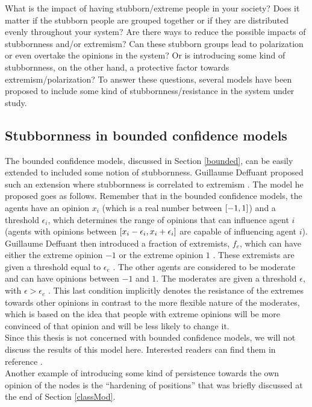 \documentclass[11 pt , letterpaper , twoside , openright]{book}
\begin{document}
\newline
What is the impact of having stubborn/extreme people in your society? Does it matter if the stubborn people are grouped together or if they are distributed evenly throughout your system? Are there ways to reduce the possible impacts of stubbornness and/or extremism? Can these stubborn groups lead to polarization or even overtake the opinions in the system? Or is introducing some kind of stubbornness, on the other hand, a protective factor towards extremism/polarization? To answer these questions, several models have been proposed to include some kind of stubbornness/resistance in the system under study.

\subsection{Stubbornness in bounded confidence models}

The bounded confidence models, discussed in Section \ref{bounded}, can be easily extended to included some notion of stubbornness. Guillaume Deffuant proposed such an extension where stubbornness is correlated to extremism \cite{Deffuant2006}. The model he proposed goes as follows. Remember that in the bounded confidence models, the agents have an opinion $x_i$ (which is a real number between $\interval{-1}{1}$) and a threshold $\epsilon_i$, which determines the range of opinions that can influence agent $i$ (agents with opinions between $\interval{x_i - \epsilon_i}{x_i + \epsilon_i}$ are capable of influencing agent $i$). Guillaume Deffuant then introduced a fraction of extremists, $f_e$, which can have either the extreme opinion $-1$ or the extreme opinion $1$ \cite{Deffuant2006}. These extremists are given a threshold equal to $\epsilon_e$ \cite{Deffuant2006}. The other agents are considered to be moderate and can have opinions between $-1$ and $1$. The moderates are given a threshold $\epsilon$, with $\epsilon > \epsilon_e$ \cite{Deffuant2006}. This last condition implicitly denotes the resistance of the extremes towards other opinions in contrast to the more flexible nature of the moderates, which is based on the idea that people with extreme opinions will be more convinced of that opinion and will be less likely to change it.\\
\newline
Since this thesis is not concerned with bounded confidence models, we will not discuss the results of this model here. Interested readers can find them in reference \cite{Deffuant2006}. \\
\newline
Another example of introducing some kind of persistence towards the own opinion of the nodes is the ``hardening of positions'' that was briefly discussed at the end of Section \ref{classMod}.
\end{document}
